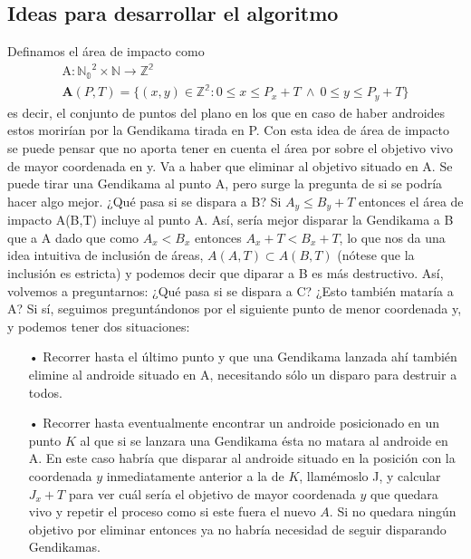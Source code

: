 \documentclass[10pt,a4paper]{article}
\begin{document}
\newpage
\subsection{Ideas para desarrollar el algoritmo}

Definamos el área de impacto como
\begin{gather*}
\textrm{A}:\mathbb{N_{0}}^2 \times \mathbb{N} \rightarrow \mathbb{Z^2}\\
 \mathbf{A}(P,T) = \{ (x, y) \in \mathbb{Z^2} : 0 \leq x \leq P_{x}+T ~ \wedge ~ 0 \leq y \leq P_{y}+T \}
\end{gather*}
 es decir, el conjunto de puntos del plano en los que en caso de haber androides estos morirían por la Gendikama tirada en P. Con esta idea de área de impacto se puede pensar que no aporta tener en cuenta el área por sobre el objetivo vivo de mayor coordenada en y.
Va a haber que eliminar al objetivo situado en A. Se puede tirar una Gendikama al punto A, pero surge la pregunta de si se podría hacer algo mejor. ¿Qué pasa si se dispara a B? Si $ A_{y} \leq B_{y}+T$ entonces el área de impacto A(B,T) incluye al punto A. Así, sería mejor disparar la Gendikama a B que a A dado que como  $A_{x} < B_{x}$ entonces  $A_{x}+T < B_{x}+T$, lo que nos da una idea intuitiva de inclusión de áreas, $A(A,T) \subset A(B,T)$ (nótese que la inclusión es estricta) y podemos decir que diparar a B es más destructivo.
Así, volvemos a preguntarnos: ¿Qué pasa si se dispara a C? ¿Esto también mataría a A?
Si sí, seguimos preguntándonos por el siguiente punto de menor coordenada y, y podemos tener dos situaciones:

\begin{itemize}
\item[•] Recorrer hasta el último punto y que una Gendikama lanzada ahí también elimine al androide situado en A, necesitando sólo un disparo para destruir a todos.
\item[•] Recorrer hasta eventualmente encontrar un androide posicionado en un punto $K$ al que si se lanzara una Gendikama ésta no matara al androide en A. En este caso habría que disparar al androide situado en la posición con la coordenada $y$ inmediatamente anterior a la de $K$, llamémoslo J, y calcular $J_{x}+T$ para ver cuál sería el objetivo de mayor coordenada $y$ que quedara vivo  y repetir el proceso como si este fuera el nuevo $A$. Si no quedara ningún objetivo por eliminar entonces ya no habría necesidad de seguir disparando Gendikamas.
\end{itemize}
\end{document}
